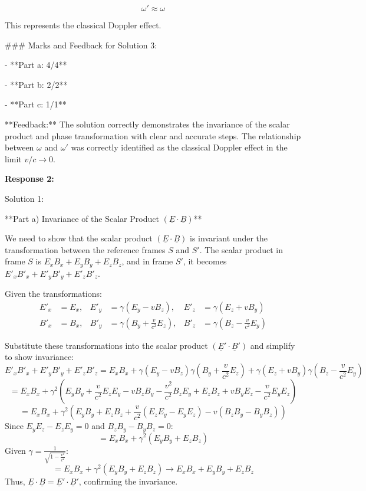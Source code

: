 \documentclass[a4paper,11pt]{article}
\begin{document}
\[
\omega' \approx \omega
\]

This represents the classical Doppler effect.

### Marks and Feedback for Solution 3:

- **Part a: 4/4**

- **Part b: 2/2**

- **Part c: 1/1**

**Feedback:** The solution correctly demonstrates the invariance of the scalar product and phase transformation with clear and accurate steps. The relationship between \(\omega\) and \(\omega'\) was correctly identified as the classical Doppler effect in the limit \(v/c \rightarrow 0\).

\bigskip
\textbf{Response 2:}

Solution 1: 

**Part a) Invariance of the Scalar Product \( (\underline{E} \cdot \underline{B}) \)**

We need to show that the scalar product \( (\underline{E} \cdot \underline{B}) \) is invariant under the transformation between the reference frames \( S \) and \( S' \). The scalar product in frame \( S \) is \( E_x B_x + E_y B_y + E_z B_z \), and in frame \( S' \), it becomes \( E'_x B'_x + E'_y B'_y + E'_z B'_z \).

Given the transformations:
\[
\begin{aligned}
E'_{x} &= E_{x}, & E'_{y} &= \gamma(E_{y} - vB_{z}), & E'_{z} &= \gamma(E_{z} + vB_{y}) \\
B'_{x} &= B_{x}, & B'_{y} &= \gamma(B_{y} + \frac{v}{c^{2}} E_{z}), & B'_{z} &= \gamma(B_{z} - \frac{v}{c^{2}} E_{y})
\end{aligned}
\]

Substitute these transformations into the scalar product \( (\underline{E}' \cdot \underline{B}') \) and simplify to show invariance:
\[
E'_x B'_x + E'_y B'_y + E'_z B'_z = E_x B_x + \gamma(E_y - v B_z) \gamma(B_y + \frac{v}{c^2} E_z) + \gamma(E_z + v B_y) \gamma(B_z - \frac{v}{c^2} E_y)
\]
\[
= E_x B_x + \gamma^2(E_y B_y + \frac{v}{c^2} E_z E_y - v B_z B_y - \frac{v^2}{c^2} B_z E_y + E_z B_z + v B_y E_z - \frac{v}{c^2} E_y E_z)
\]
\[
= E_x B_x + \gamma^2 (E_y B_y + E_z B_z + \frac{v}{c^2} (E_z E_y - E_y E_z) - v (B_z B_y - B_y B_z))
\]
Since \(E_y E_z - E_z E_y = 0\) and \(B_z B_y - B_y B_z = 0\):
\[
= E_x B_x + \gamma^2 (E_y B_y + E_z B_z)
\]
Given \(\gamma = \frac{1}{\sqrt{1 - \frac{v^2}{c^2}}}\):
\[
= E_x B_x + \gamma^2 (E_y B_y + E_z B_z) \rightarrow E_x B_x + E_y B_y + E_z B_z \]
Thus, \(\underline{E} \cdot \underline{B} = \underline{E}' \cdot \underline{B}'\), confirming the invariance.
\end{document}
